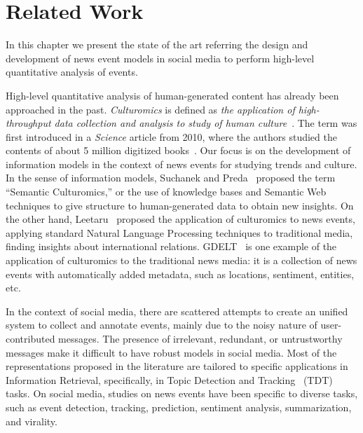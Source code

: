 \chapter{Related Work}


In this chapter we present the state of the art referring the design and
development of news event models in social media to perform high-level
quantitative analysis of events.


High-level quantitative analysis of human-generated content has already been
approached in the past. 
%
{\em Culturomics} is defined as {\em the application of high-throughput data
collection and analysis to study of human culture}~\cite{Michel176}. 
%
The term was first introduced in a {\em Science} article from 2010, where the
authors studied the contents of about 5 million digitized
books~\cite{Michel176}. 
%
Our focus is on the development of information models in the context
of news events for studying trends and culture.
%
In the sense of information models, Suchanek and
Preda~\cite{Suchanek:2014:SC:2732977.2732994} proposed the term ``Semantic
Culturomics,'' or the use of knowledge bases and Semantic Web techniques to give
structure to human-generated data to obtain new insights.
%
On the other hand, Leetaru~\cite{leetaru2011culturomics} proposed the
application of culturomics to news events, applying standard Natural Language
Processing techniques to traditional media, finding insights about international
relations.
%
GDELT~\cite{leetaru2013gdelt} is one example of the application of culturomics
to the traditional news media: it is a collection of news events with
automatically added metadata, such as locations, sentiment, entities, etc.


In the context of social media, there are scattered attempts to create an
unified system to collect and annotate events, mainly due to the noisy nature of
user-contributed messages.
%
The presence of irrelevant, redundant, or untrustworthy messages make it
difficult to have robust models in social media.
%
Most of the representations proposed in the literature are tailored to specific
applications in Information Retrieval, specifically, in Topic Detection and
Tracking~\cite{allan2012topic} (TDT) tasks.
%
On social media, studies on news events have been specific to diverse tasks,
such as event detection, tracking, prediction, sentiment analysis,
summarization, and virality. 


